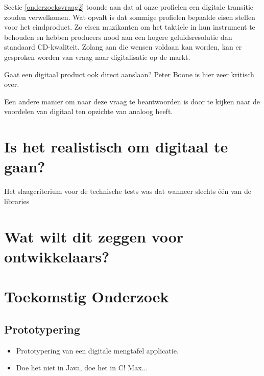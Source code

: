 Sectie \ref{onderzoeksvraag2} toonde aan dat al onze profielen een digitale transitie zouden verwelkomen. Wat opvalt is dat sommige profielen bepaalde eisen stellen voor het eindproduct. Zo eisen muzikanten om het taktiele in hun instrument te behouden en hebben producers nood aan een hogere geluidsresolutie dan standaard CD-kwaliteit. Zolang aan die wensen voldaan kan worden, kan er gesproken worden van vraag naar digitalisatie op de markt.

Gaat een digitaal product ook direct aanslaan? Peter Boone is hier zeer kritisch over. 

Een andere manier om naar deze vraag te beantwoorden is door te kijken naar de voordelen van digitaal ten opzichte van analoog heeft.

\section{Is het realistisch om digitaal te gaan?}

Het slaagcriterium voor de technische tests was dat wanneer slechts één van de libraries 

\section{Wat wilt dit zeggen voor ontwikkelaars?}

\section{Toekomstig Onderzoek}

\subsection{Prototypering}



\begin{itemize}
	\item Prototypering van een digitale mengtafel applicatie.
	\item Doe het niet in Java, doe het in C! Max...
\end{itemize}

\iffalse \lipsum[76-80] \fi

